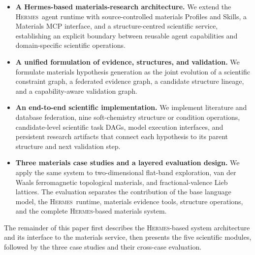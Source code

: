 \documentclass[11pt]{article}
\newcommand{\hermes}{\textsc{Hermes}}
\begin{document}
\begin{itemize}
    \item \textbf{A Hermes-based materials-research architecture.}
    We extend the \hermes\ agent runtime with source-controlled materials Profiles and Skills, a Materials MCP interface, and a structure-centred scientific service, establishing an explicit boundary between reusable agent capabilities and domain-specific scientific operations.

    \item \textbf{A unified formulation of evidence, structures, and validation.}
    We formulate materials hypothesis generation as the joint evolution of a scientific constraint graph, a federated evidence graph, a candidate structure lineage, and a capability-aware validation graph.

    \item \textbf{An end-to-end scientific implementation.}
    We implement literature and database federation, nine soft-chemistry structure or condition operations, candidate-level scientific task DAGs, model execution interfaces, and persistent research artifacts that connect each hypothesis to its parent structure and next validation step.

    \item \textbf{Three materials case studies and a layered evaluation design.}
    We apply the same system to two-dimensional flat-band exploration, van der Waals ferromagnetic topological materials, and fractional-valence Lieb lattices. The evaluation separates the contribution of the base language model, the \hermes\ runtime, materials evidence tools, structure operations, and the complete \hermes-based materials system.
\end{itemize}

The remainder of this paper first describes the \hermes-based system architecture and its interface to the materials service, then presents the five scientific modules, followed by the three case studies and their cross-case evaluation.














\end{document}
